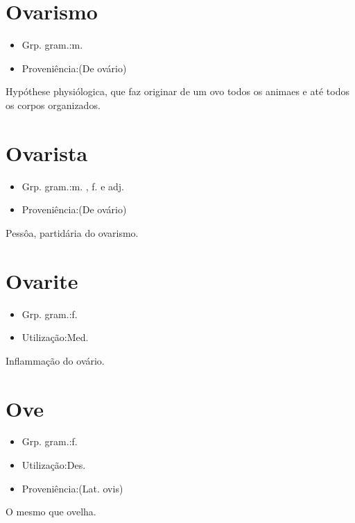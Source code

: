 \section{Ovarismo}
\begin{itemize}
\item {Grp. gram.:m.}
\end{itemize}
\begin{itemize}
\item {Proveniência:(De \textunderscore ovário\textunderscore )}
\end{itemize}
Hypóthese physiólogica, que faz originar de um ovo todos os animaes e até todos os corpos organizados.
\section{Ovarista}
\begin{itemize}
\item {Grp. gram.:m. ,  f.  e  adj.}
\end{itemize}
\begin{itemize}
\item {Proveniência:(De \textunderscore ovário\textunderscore )}
\end{itemize}
Pessôa, partidária do ovarismo.
\section{Ovarite}
\begin{itemize}
\item {Grp. gram.:f.}
\end{itemize}
\begin{itemize}
\item {Utilização:Med.}
\end{itemize}
Inflammação do ovário.
\section{Ove}
\begin{itemize}
\item {Grp. gram.:f.}
\end{itemize}
\begin{itemize}
\item {Utilização:Des.}
\end{itemize}
\begin{itemize}
\item {Proveniência:(Lat. \textunderscore ovis\textunderscore )}
\end{itemize}
O mesmo que \textunderscore ovelha\textunderscore .
